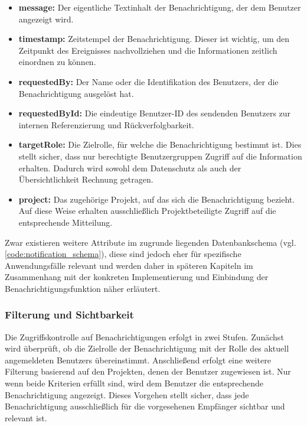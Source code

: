 \begin{itemize}
    \item \textbf{message:} Der eigentliche Textinhalt der Benachrichtigung, der dem Benutzer angezeigt wird.
    \item \textbf{timestamp:} Zeitstempel der Benachrichtigung. Dieser ist wichtig, um den Zeitpunkt des Ereignisses nachvollziehen und die Informationen zeitlich einordnen zu können.
    \item \textbf{requestedBy:} Der Name oder die Identifikation des Benutzers, der die Benachrichtigung ausgelöst hat.
    \item \textbf{requestedById:} Die eindeutige Benutzer-ID des sendenden Benutzers zur internen Referenzierung und Rückverfolgbarkeit.
    \item \textbf{targetRole:} Die Zielrolle, für welche die Benachrichtigung bestimmt ist. Dies stellt sicher, dass nur berechtigte Benutzergruppen Zugriff auf die Information erhalten. Dadurch wird sowohl dem Datenschutz als auch der Übersichtlichkeit Rechnung getragen.
    \item \textbf{project:} Das zugehörige Projekt, auf das sich die Benachrichtigung bezieht. Auf diese Weise erhalten ausschließlich Projektbeteiligte Zugriff auf die entsprechende Mitteilung.
\end{itemize}


Zwar existieren weitere Attribute im zugrunde liegenden Datenbankschema (vgl. \autoref{code:notification_schema}), diese sind jedoch eher für spezifische Anwendungsfälle relevant und werden daher in späteren Kapiteln im Zusammenhang mit der konkreten Implementierung und Einbindung der Benachrichtigungsfunktion näher erläutert.

\subsubsection*{Filterung und Sichtbarkeit}

Die Zugriffskontrolle auf Benachrichtigungen erfolgt in zwei Stufen. Zunächst wird überprüft, ob die Zielrolle der Benachrichtigung mit der Rolle des aktuell angemeldeten Benutzers übereinstimmt. Anschließend erfolgt eine weitere Filterung basierend auf den Projekten, denen der Benutzer zugewiesen ist. Nur wenn beide Kriterien erfüllt sind, wird dem Benutzer die entsprechende Benachrichtigung angezeigt. Dieses Vorgehen stellt sicher, dass jede Benachrichtigung ausschließlich für die vorgesehenen Empfänger sichtbar und relevant ist.

